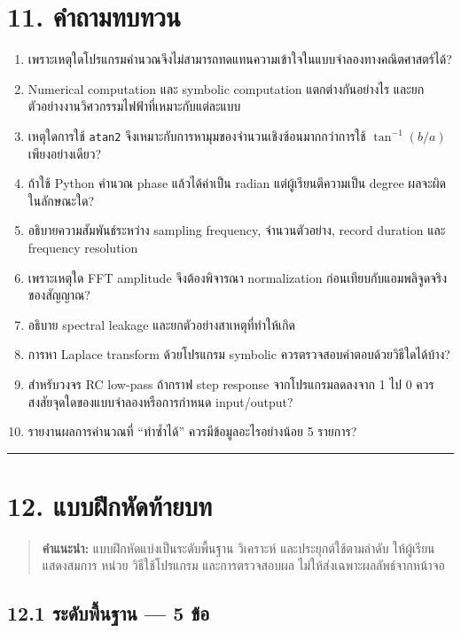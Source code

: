\section{11. คำถามทบทวน}

\begin{enumerate}
    \item เพราะเหตุใดโปรแกรมคำนวณจึงไม่สามารถทดแทนความเข้าใจในแบบจำลองทางคณิตศาสตร์ได้?
    \item Numerical computation และ symbolic computation แตกต่างกันอย่างไร และยกตัวอย่างงานวิศวกรรมไฟฟ้าที่เหมาะกับแต่ละแบบ
    \item เหตุใดการใช้ \texttt{atan2} จึงเหมาะกับการหามุมของจำนวนเชิงซ้อนมากกว่าการใช้ $\tan^{-1}(b/a)$ เพียงอย่างเดียว?
    \item ถ้าใช้ Python คำนวณ phase แล้วได้ค่าเป็น radian แต่ผู้เรียนตีความเป็น degree ผลจะผิดในลักษณะใด?
    \item อธิบายความสัมพันธ์ระหว่าง sampling frequency, จำนวนตัวอย่าง, record duration และ frequency resolution
    \item เพราะเหตุใด FFT amplitude จึงต้องพิจารณา normalization ก่อนเทียบกับแอมพลิจูดจริงของสัญญาณ?
    \item อธิบาย spectral leakage และยกตัวอย่างสาเหตุที่ทำให้เกิด
    \item การหา Laplace transform ด้วยโปรแกรม symbolic ควรตรวจสอบคำตอบด้วยวิธีใดได้บ้าง?
    \item สำหรับวงจร RC low-pass ถ้ากราฟ step response จากโปรแกรมลดลงจาก 1 ไป 0 ควรสงสัยจุดใดของแบบจำลองหรือการกำหนด input/output?
    \item รายงานผลการคำนวณที่ “ทำซ้ำได้” ควรมีข้อมูลอะไรอย่างน้อย 5 รายการ?
\end{enumerate}

\par\noindent\rule{\textwidth}{0.4pt}\par

\section{12. แบบฝึกหัดท้ายบท}

\begin{quote}
\textbf{คำแนะนำ:} แบบฝึกหัดแบ่งเป็นระดับพื้นฐาน วิเคราะห์ และประยุกต์ใช้ตามลำดับ ให้ผู้เรียนแสดงสมการ หน่วย วิธีใช้โปรแกรม และการตรวจสอบผล ไม่ให้ส่งเฉพาะผลลัพธ์จากหน้าจอ
\end{quote}

\subsection{12.1 ระดับพื้นฐาน — 5 ข้อ}


